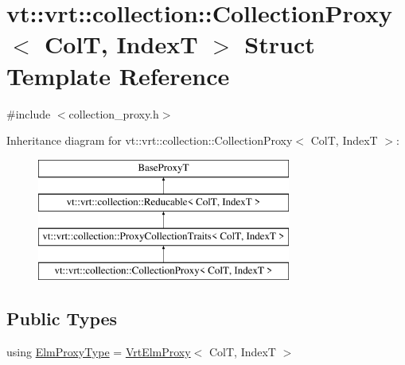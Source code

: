 \hypertarget{structvt_1_1vrt_1_1collection_1_1_collection_proxy}{}\section{vt\+:\+:vrt\+:\+:collection\+:\+:Collection\+Proxy$<$ ColT, IndexT $>$ Struct Template Reference}
\label{structvt_1_1vrt_1_1collection_1_1_collection_proxy}


{\ttfamily \#include $<$collection\+\_\+proxy.\+h$>$}

Inheritance diagram for vt\+:\+:vrt\+:\+:collection\+:\+:Collection\+Proxy$<$ ColT, IndexT $>$\+:\begin{figure}[H]
\begin{center}
\leavevmode
\includegraphics[height=4.000000cm]{structvt_1_1vrt_1_1collection_1_1_collection_proxy}
\end{center}
\end{figure}
\subsection*{Public Types}
\begin{DoxyCompactItemize}
\item 
using \hyperlink{structvt_1_1vrt_1_1collection_1_1_collection_proxy_a892c21eae1dca37321d7973f72b55b0a}{Elm\+Proxy\+Type} = \hyperlink{structvt_1_1vrt_1_1collection_1_1_vrt_elm_proxy}{Vrt\+Elm\+Proxy}$<$ ColT, IndexT $>$
\end{DoxyCompactItemize}
